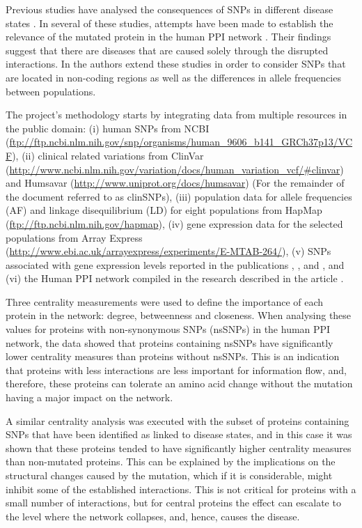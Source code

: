 Previous studies have analysed the consequences of SNPs in different disease states \cite{BAU2009}. In several of these studies, attempts have been made to establish the relevance of the mutated protein in the human PPI network \cite{SAU2011}. Their findings suggest that there are diseases that are caused solely through the disrupted interactions. In \cite{HEE2014} the authors extend these studies in order to consider SNPs that are located in non-coding regions as well as the differences in allele frequencies between populations.

The project's methodology starts by integrating data from multiple resources in the public domain: (i) human SNPs from NCBI (\url{ftp://ftp.ncbi.nlm.nih.gov/snp/organisms/human_9606_b141_GRCh37p13/VCF}), (ii) clinical related variations from ClinVar (\url{http://www.ncbi.nlm.nih.gov/variation/docs/human_variation_vcf/#clinvar}) and Humsavar (\url{http://www.uniprot.org/docs/humsavar})  (For the remainder of the document referred to as clinSNPs), (iii) population data for allele frequencies (AF) and linkage disequilibrium (LD) for eight populations from HapMap (\url{ftp://ftp.ncbi.nlm.nih.gov/hapmap}), (iv) gene expression data for the selected populations from Array Express (\url{http://www.ebi.ac.uk/arrayexpress/experiments/E-MTAB-264/}), (v) SNPs associated with gene expression levels reported in the publications \cite{STR2007}, \cite{LAP2013}, \cite{HAU2014} and \cite{WU2013}, and (vi) the Human PPI network compiled in the research described in the article \cite{RAP2013}.

Three centrality measurements were used to define the importance of each protein in the network: degree, betweenness and closeness. When analysing these values for proteins with non-synonymous SNPs (nsSNPs) in the human PPI network, the data showed that proteins containing nsSNPs have significantly lower centrality measures than proteins without nsSNPs. This is an indication that proteins with less interactions are less important for information flow, and, therefore, these proteins can tolerate an amino acid change without the mutation having a major impact on the network.

A similar centrality analysis was executed with the subset of proteins containing SNPs that have been identified as linked to disease states, and in this case it was shown that these proteins tended to have significantly higher centrality measures than non-mutated proteins. This can be explained by the implications on the structural changes caused by the mutation, which if it is considerable, might inhibit some of the established interactions. This is not critical for proteins with a small number of interactions, but for central proteins the effect can escalate to the level where the network collapses, and, hence, causes the disease.

